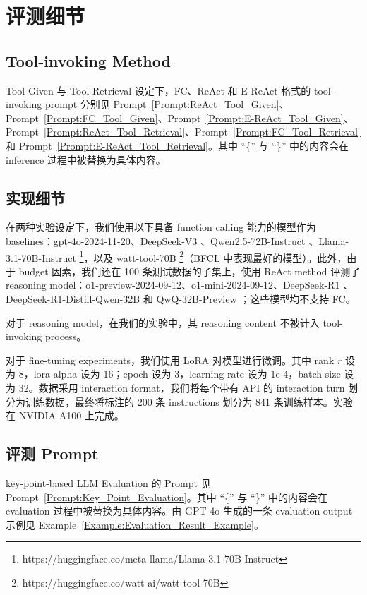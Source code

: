 \documentclass[11pt]{article}
\begin{document}
\section{评测细节}
\label{sec:evaluation_details}

\subsection{Tool-invoking Method}
Tool-Given 与 Tool-Retrieval 设定下，FC、ReAct 和 E-ReAct 格式的 tool-invoking prompt 分别见 Prompt~\ref{Prompt:ReAct_Tool_Given}、Prompt~\ref{Prompt:FC_Tool_Given}、Prompt~\ref{Prompt:E-ReAct_Tool_Given}、Prompt~\ref{Prompt:ReAct_Tool_Retrieval}、Prompt~\ref{Prompt:FC_Tool_Retrieval} 和 Prompt~\ref{Prompt:E-ReAct_Tool_Retrieval}。其中 ``\{'' 与 ``\}'' 中的内容会在 inference 过程中被替换为具体内容。





\subsection{实现细节}
在两种实验设定下，我们使用以下具备 function calling 能力的模型作为 baselines：gpt-4o-2024-11-20、DeepSeek-V3 \cite{deepseekai2024deepseekv3technicalreport}、Qwen2.5-72B-Instruct \cite{qwen2.5}、Llama-3.1-70B-Instruct \footnote{https://huggingface.co/meta-llama/Llama-3.1-70B-Instruct}，以及 watt-tool-70B \footnote{https://huggingface.co/watt-ai/watt-tool-70B}（BFCL 中表现最好的模型）。此外，由于 budget 因素，我们还在 100 条测试数据的子集上，使用 ReAct method 评测了 reasoning model：o1-preview-2024-09-12、o1-mini-2024-09-12、DeepSeek-R1 \cite{deepseekai2025deepseekr1incentivizingreasoningcapability}、DeepSeek-R1-Distill-Qwen-32B \cite{deepseekai2025deepseekr1incentivizingreasoningcapability} 和 QwQ-32B-Preview \cite{qwq-32b-preview}；这些模型均不支持 FC。



对于 reasoning model，在我们的实验中，其 reasoning content 不被计入 tool-invoking process。

对于 fine-tuning experiments，我们使用 LoRA 对模型进行微调。其中 rank $r$ 设为 8，lora alpha 设为 16；epoch 设为 3，learning rate 设为 1e-4，batch size 设为 32。数据采用 interaction format，我们将每个带有 API 的 interaction turn 划分为训练数据，最终将标注的 200 条 instructions 划分为 841 条训练样本。实验在 NVIDIA A100 上完成。

\subsection{评测 Prompt}
key-point-based LLM Evaluation 的 Prompt 见 Prompt~\ref{Prompt:Key_Point_Evaluation}。其中 ``\{'' 与 ``\}'' 中的内容会在 evaluation 过程中被替换为具体内容。由 GPT-4o 生成的一条 evaluation output 示例见 Example~\ref{Example:Evaluation_Result_Example}。
\end{document}
